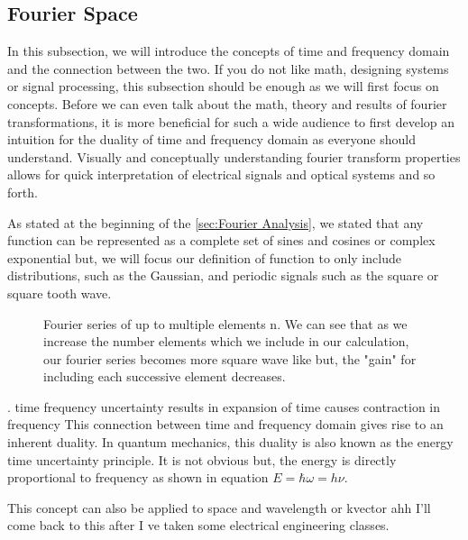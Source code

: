 \documentclass[11pt,a4paper]{book}
\newcommand{\imginput}[1]{} %
\begin{document}
		\subsection{Fourier Space}
			\label{subsec:Fourier Series}
			In this subsection, we will introduce the concepts of time and frequency domain and the connection between the two. If you do not like math, designing systems or signal processing, this subsection should be enough as we will first focus on concepts. Before we can even talk about the math, theory and results of fourier transformations, it is more beneficial for such a wide audience to first develop an intuition for the duality of time and frequency domain as everyone should understand. Visually and conceptually understanding fourier transform properties allows for quick interpretation of electrical signals and optical systems and so forth.
			
			As stated at the beginning of the \autoref{sec:Fourier Analysis}, we stated that any function can be represented as a complete set of sines and cosines or complex exponential but, we will focus our definition of function to only include distributions, such as the Gaussian, and periodic signals such as the square or square tooth wave. 
			
			\begin{figure} [!ht]
				\centering
				\def\svgwidth{\columnwidth}
				\resizebox{16cm}{!}{\imginput{images/fourier-series-squarewave.pdf_tex}}
				\label{fig:fourier-series-squarewave}
				\caption{Fourier series of up to multiple elements n. We can see that as we increase the number elements which we include in our calculation, our fourier series becomes more square wave like but, the "gain" for including each successive element  decreases.}
			\end{figure}	
			
			. time frequency uncertainty
			results in
			expansion of time causes contraction in frequency
			This connection between time and frequency domain gives rise to an inherent duality. In quantum mechanics, this duality is also known as the energy time uncertainty principle. It is not obvious but, the energy is directly proportional to frequency as shown in equation $E=\hbar\omega=h\nu$. 
			
			This concept can also be applied to space and wavelength or kvector 
			ahh I'll come back to this after I ve taken some electrical engineering classes.
\end{document}
